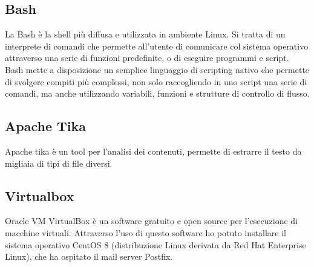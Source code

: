     
    \subsection{Bash}
    La Bash è la shell più diffusa e utilizzata in ambiente Linux. 
    Si tratta di un interprete di comandi che permette all'utente di comunicare col sistema operativo attraverso una
    serie di funzioni predefinite, o di eseguire programmi e script.
    Bash mette a disposizione un semplice linguaggio di scripting nativo che permette di svolgere compiti 
    più complessi, non solo raccogliendo in uno script una serie di comandi, 
    ma anche utilizzando variabili, funzioni e strutture di controllo di flusso.\cite{Bash1}
    
    \subsection{Apache Tika}
    Apache tika è un tool per l’analisi dei contenuti, permette di estrarre il testo da migliaia di tipi di file diversi.\cite{tika} 
    
    \subsection{Virtualbox}
    Oracle VM VirtualBox è un software gratuito e open source per l'esecuzione di macchine virtuali. \cite{VirtualBox1}
    Attraverso l’uso di questo software ho potuto installare il sistema operativo CentOS 8 
    (distribuzione Linux derivata da Red Hat Enterprise Linux), che ha ospitato il mail server Postfix.